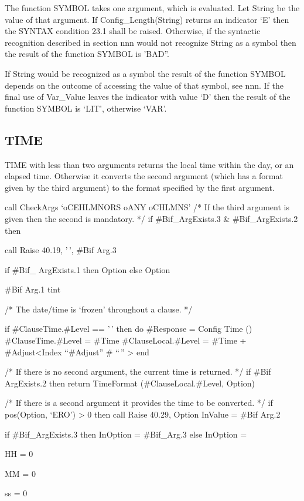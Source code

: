 The function SYMBOL takes one argument, which is evaluated. Let String
be the value of that argument. If Config\_Length(String) returns an
indicator `E' then the SYNTAX condition 23.1 shall be raised. Otherwise,
if the syntactic recognition described in section nnn would not
recognize String as a symbol then the result of the function SYMBOL is
'BAD''.

If String would be recognized as a symbol the result of the function
SYMBOL depends on the outcome of accessing the value of that symbol, see
nnn. If the final use of Var\_Value leaves the indicator with value `D'
then the result of the function SYMBOL is `LIT', otherwise `VAR'.

\hypertarget{time}{%
\subsection{TIME}\label{time}}

TIME with less than two arguments returns the local time within the day,
or an elapsed time. Otherwise it converts the second argument (which has
a format given by the third argument) to the format specified by the
first argument.

call CheckArgs `oCEHLMNORS oANY oCHLMNS' /* If the third argument is
given then the second is mandatory. */ if \#Bif\_ArgExists.3 \&
\#Bif\_ArgExists.2 then

call Raise 40.19, '\,', \#Bif Arg.3

if \#Bif\_ ArgExists.1 then Option else Option

\#Bif Arg.1 tint

/* The date/time is `frozen' throughout a clause. */

if \#ClauseTime.\#Level == '\,' then do \#Response = Config Time ()
\#ClauseTime.\#Level = \#Time \#ClauseLocal.\#Level = \#Time +
\#Adjust\textless Index ``\#Adjust'' \# ``\,'' \textgreater{} end

/* If there is no second argument, the current time is returned. */ if
\#Bif ArgExists.2 then return TimeFormat (\#ClauseLocal.\#Level, Option)

/* If there is a second argument it provides the time to be converted.
*/ if pos(Option, `ERO') \textgreater{} 0 then call Raise 40.29, Option
InValue = \#Bif Arg.2

if \#Bif\_ArgExists.3 then InOption = \#Bif\_Arg.3 else InOption =

HH = 0

MM = 0

ss = 0

